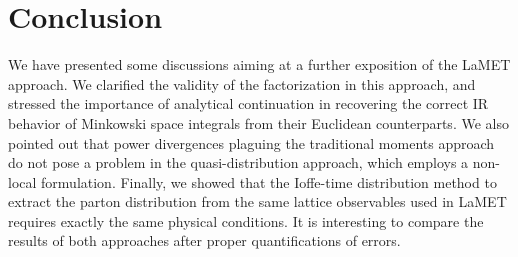 \section{Conclusion}

We have presented some discussions aiming at a further exposition of the LaMET approach.
We clarified the validity of the factorization in this approach, and stressed the importance
of analytical continuation in recovering the correct IR behavior of Minkowski space integrals
from their Euclidean counterparts. We also pointed out that power divergences plaguing the traditional
moments approach do not pose a problem in the quasi-distribution approach, which employs
a non-local formulation.
Finally, we showed that the Ioffe-time distribution method to extract the parton
distribution from the same lattice observables used in LaMET requires exactly the same
physical conditions. It is interesting to compare the results of both approaches
after proper quantifications of errors.

